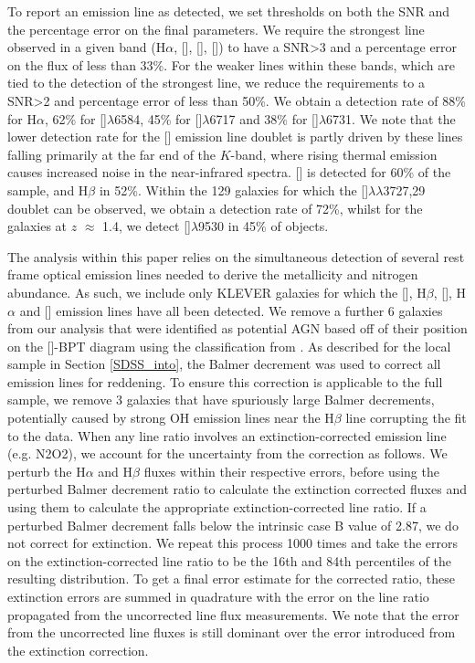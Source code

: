 \documentclass[usenatbib]{mnras} %
\begin{document}
To report an emission line as detected, we set thresholds on both the SNR and the percentage error on the final parameters. We require the strongest line observed in a given band (H$\alpha$, [], [], []) to have a SNR>3 and a percentage error on the flux of less than 33\%. For the weaker lines within these bands, which are tied to the detection of the strongest line, we reduce the requirements to a SNR>2 and percentage error of less than 50\%. We obtain a detection rate of 88\% for H$\alpha$, 62\% for []$\lambda$6584, 45\% for []$\lambda$6717 and 38\% for []$\lambda$6731. We note that the lower detection rate for the [] emission line doublet is partly driven by these lines falling primarily at the far end of the $K$-band, where rising thermal emission causes increased noise in the near-infrared spectra. [] is detected for 60\% of the sample, and H$\beta$ in 52\%. Within the 129 galaxies for which the []$\lambda\lambda$3727,29 doublet can be observed, we obtain a detection rate of 72\%, whilst for the galaxies at $z$ $\approx$ 1.4, we detect []$\lambda$9530 in 45\% of objects. 

The analysis within this paper relies on the simultaneous detection of several rest frame optical emission lines needed to derive the metallicity and nitrogen abundance. As such, we include only KLEVER galaxies for which the [], H$\beta$,  [], H$\alpha$ and [] emission lines have all been detected. We remove a further 6 galaxies from our analysis that were identified as potential AGN based off of their position on the []-BPT diagram using the classification from \cite{Kauffmann_2003b}. As described for the local sample in Section \ref{SDSS_into}, the Balmer decrement was used to correct all emission lines for reddening. To ensure this correction is applicable to the full sample, we remove 3 galaxies that have spuriously large Balmer decrements, potentially caused by strong OH emission lines near the H$\beta$ line corrupting the fit to the data. When any line ratio involves an extinction-corrected emission line (e.g. N2O2), we account for the uncertainty from the correction as follows. We perturb the H$\alpha$ and H$\beta$ fluxes within their respective errors, before using the perturbed Balmer decrement ratio to calculate the extinction corrected fluxes and using them to calculate the appropriate extinction-corrected line ratio. If a perturbed Balmer decrement falls below the intrinsic case B value of 2.87, we do not correct for extinction. We repeat this process 1000 times and take the errors on the extinction-corrected line ratio to be the 16th and 84th percentiles of the resulting distribution. To get a final error estimate for the corrected ratio, these extinction errors are summed in quadrature with the error on the line ratio propagated from the uncorrected line flux measurements. We note that the error from the uncorrected line fluxes is still dominant over the error introduced from the extinction correction.
\end{document}
